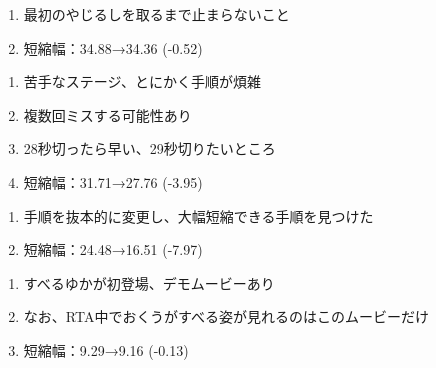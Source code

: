 \begin{enumerate}[label={\sarrow}]
\item 最初のやじるしを取るまで止まらないこと
\item 短縮幅：34.88→34.36 (-0.52)
\end{enumerate}



\begin{enumerate}[label={\sarrow}]
\item 苦手なステージ、とにかく手順が煩雑
\item 複数回ミスする可能性あり
\item 28秒切ったら早い、29秒切りたいところ
\item 短縮幅：31.71→27.76 (-3.95)
\end{enumerate}



\begin{enumerate}[label={\sarrow}]
\item 手順を抜本的に変更し、大幅短縮できる手順を見つけた
\item 短縮幅：24.48→16.51 (-7.97)
\end{enumerate}



\begin{enumerate}[label={\sarrow}]
\item すべるゆかが初登場、デモムービーあり
\item なお、RTA中でおくうがすべる姿が見れるのはこのムービーだけ
\item 短縮幅：9.29→9.16 (-0.13)
\end{enumerate}



